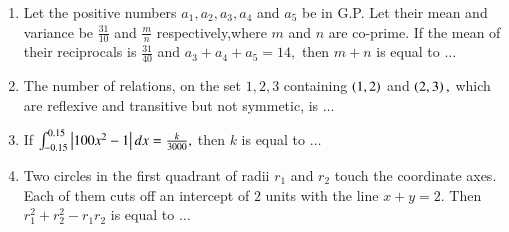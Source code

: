 \documentclass[journal,12pt,twocolumn]{IEEEtran}
\theoremstyle{remark}
\begin{document}
\begin{enumerate}[start=16]
    \item Let the positive numbers $a_1,a_2,a_3,a_4$ and $a_5$ be in G.P. Let their mean and variance be $\frac{31}{10}$ and $\frac{m}{n}$ respectively,where $m$ and $n$ are co-prime. If the mean of their reciprocals is $\frac{31}{40}$ and $a_3+a_4+a_5=14,$ then $m+n$ is equal to $\dots$\\
    \item The number of relations, on the set ${1,2,3}$ containing $\left(1,2\right)$ and $\left(2,3\right),$ which are reflexive and transitive but not symmetic, is $\dots$\\
    \item If $\int_{-0.15}^{0.15}\left\vert100x^2-1\right\vert dx=\frac{k}{3000},$ then $k$ is equal to $\dots$\\
    \item Two circles in the first quadrant of radii $r_1$ and $r_2$ touch the coordinate axes. Each of them cuts off an intercept of $2$ units with the line $x+y=2.$ Then $r_1^2+r_2^2-r_1r_2$ is equal to $\dots$
\end{enumerate}
\end{document}
